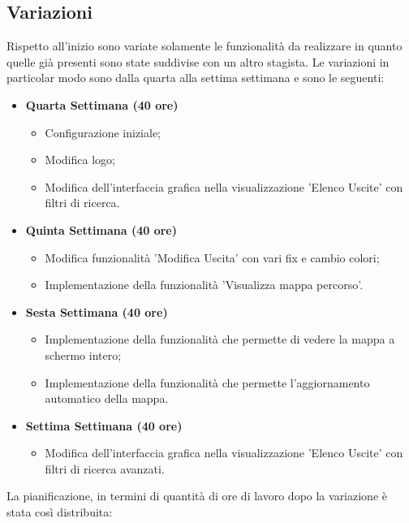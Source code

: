 \subsection{Variazioni}
Rispetto all'inizio sono variate solamente le funzionalità da realizzare in quanto quelle già presenti sono state suddivise con un altro stagista.
Le variazioni in particolar modo sono dalla quarta alla settima settimana e sono le seguenti:
\begin{itemize}
\item \textbf{Quarta Settimana (40 ore)} 
\begin{itemize}
	\item Configurazione iniziale;
	\item Modifica logo;
	\item Modifica dell'interfaccia grafica nella visualizzazione 'Elenco Uscite' con filtri di ricerca.
\end{itemize}
\item \textbf{Quinta Settimana (40 ore)} 
\begin{itemize}
	\item Modifica funzionalità 'Modifica Uscita' con vari fix e cambio colori;
	\item Implementazione della funzionalità 'Visualizza mappa percorso'.
\end{itemize}
\item \textbf{Sesta Settimana (40 ore)} 
\begin{itemize}
	\item Implementazione della funzionalità che permette di vedere la mappa a schermo intero;
	\item Implementazione della funzionalità che permette l'aggiornamento automatico della mappa.
\end{itemize}
\item \textbf{Settima Settimana (40 ore)} 
\begin{itemize}
	\item Modifica dell'interfaccia grafica nella visualizzazione 'Elenco Uscite' con filtri di ricerca avanzati.
\end{itemize}
\end{itemize}
La pianificazione, in termini di quantità di ore di lavoro dopo la variazione è stata così distribuita:

